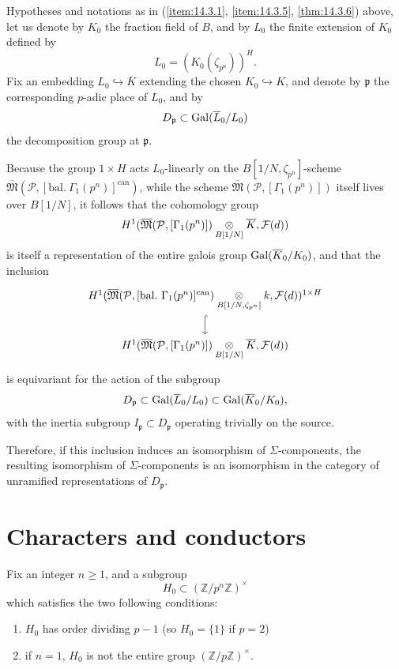\begin{keyremark}\label{rem:14.3.7}
Hypotheses and notations as in (\ref{item:14.3.1}, \ref{item:14.3.5}, \ref{thm:14.3.6}) above, let us denote by $K_0$ the fraction field of $B$, and by $L_0$ the finite extension of $K_0$ defined by
\[
L_0 = (K_0(\zeta_{p^n}))^H .
\]
Fix an embedding $L_0 \hookrightarrow \overline{K}$ extending the chosen $K_0 \hookrightarrow K$, and denote by $\mathfrak{p}$ the corresponding $p$-adic place of $L_0$, and by
\[
D_\mathfrak{p} \subset \operatorname{Gal}(\overline{L}_0/L_0)
\]
the decomposition group at $\mathfrak{p}$.

Because the group $1 \times H$ acts $L_0$-linearly on the $B[1/N, \zeta_{p^n}]$-scheme $\overline{\mathfrak{M}}(\mathcal{P}, [\mathrm{bal.}\ \Gamma_1(p^n)]^{\mathrm{can}})$, while the scheme $\overline{\mathfrak{M}}(\mathcal{P}, [\Gamma_1(p^n)])$ itself lives over $B[1/N]$, it follows that the cohomology group
\[
H^1(\overline{\mathfrak{M}}(\mathcal{P}, [\Gamma_1(p^n)]) \underset{B[1/N]}{\otimes} \overline{K}, \mathcal{F}(d))
\]
is itself a representation of the entire galois group $\operatorname{Gal}(\overline{K}_0/K_0)$, and that the inclusion
\[
\begin{tikzcd}[row sep=1.8em]
H^1(\overline{\mathfrak{M}}(\mathcal{P}, [\mathrm{bal.}\ \Gamma_1(p^n)]^{\mathrm{can}}) \tens{B[1/N, \zeta_{p^n}]} k, \mathcal{F}(d))^{1 \times H} \arrow[d, hook] \\
H^1(\overline{\mathfrak{M}}(\mathcal{P}, [\Gamma_1(p^n)]) \tens{B[1/N]} \overline{K}, \mathcal{F}(d))
\end{tikzcd}
\]
is equivariant for the action of the subgroup
\[
D_\mathfrak{p} \subset \operatorname{Gal}(\overline{L}_0/L_0) \subset \operatorname{Gal}(\overline{K}_0/K_0) ,
\]
with the inertia subgroup $I_\mathfrak{p} \subset D_\mathfrak{p}$ operating trivially on the source.

Therefore, if this inclusion induces an isomorphism of $\Sigma$-components, the resulting isomorphism of $\Sigma$-components is an isomorphism in the category of unramified representations of $D_\mathfrak{p}$.
\end{keyremark}

\section{Characters and conductors}
\label{sec:14.4}

\kmitem\label{item:14.4.1} Fix an integer $n \ge 1$, and a subgroup
\[
H_0 \subset (\mathbb{Z}/p^n\mathbb{Z})^\times
\]
which satisfies the two following conditions:
\begin{enumerate}[label=\arabic*)]
\item $H_0$ has order dividing $p-1$ (so $H_0 = \{1\}$ if $p = 2$)
\item if $n = 1$, $H_0$ is not the entire group $(\mathbb{Z}/p\mathbb{Z})^\times$.
\end{enumerate}

